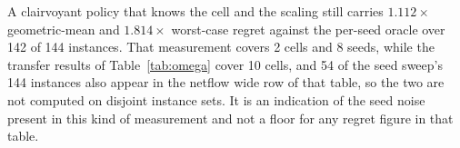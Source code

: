 
A clairvoyant policy that knows the cell and the scaling still carries
$1.112\times$ geometric-mean and $1.814\times$ worst-case regret against the
per-seed oracle over 142 of 144 instances. That measurement covers 2 cells and
8 seeds, while the transfer results of Table~\ref{tab:omega} cover 10 cells,
and 54 of the seed sweep's 144 instances also appear in the netflow wide row of
that table, so the two are not computed on disjoint instance sets. It is an
indication of the seed noise present in this kind of measurement and not a
floor for any regret figure in that table.

